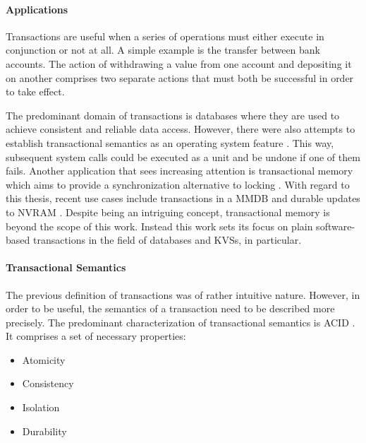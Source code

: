 \paragraph{Applications}

Transactions are useful when a series of operations must either execute in
conjunction or not at all. A simple example is the transfer between bank
accounts. The action of withdrawing a value from one account and depositing it
on another comprises two separate actions that must both be successful in order
to take effect.

The predominant domain of transactions is databases where they are used to
achieve consistent and reliable data access. However, there were also attempts
to establish transactional semantics as an operating system feature
\cite{porter2009operating, spinellis2009user, black1991understanding}. This way,
subsequent system calls could be executed as a unit and be undone if one of them
fails. Another application that sees increasing attention is transactional
memory which aims to provide a synchronization alternative to locking
\cite{knight1986architecture, herlihy1993transactional, shavit1997software}.
With regard to this thesis, recent use cases include transactions in a \ac{MMDB}
\cite{leis2014exploiting} and durable updates to \ac{NVRAM}
\cite{volos2011mnemosyne}. Despite being an intriguing concept, transactional
memory is beyond the scope of this work. Instead this work sets its focus on
plain software-based transactions in the field of databases and \acp{KVS}, in
particular.

\paragraph{Transactional Semantics}

The previous definition of transactions was of rather intuitive nature. However,
in order to be useful, the semantics of a transaction need to be described more
precisely. The predominant characterization of transactional semantics is ACID
\cite{gray1981transaction, haerder1983principles}. It comprises a set of necessary properties:

\begin{itemize}
    \item Atomicity
    \item Consistency
    \item Isolation
    \item Durability
\end{itemize}

